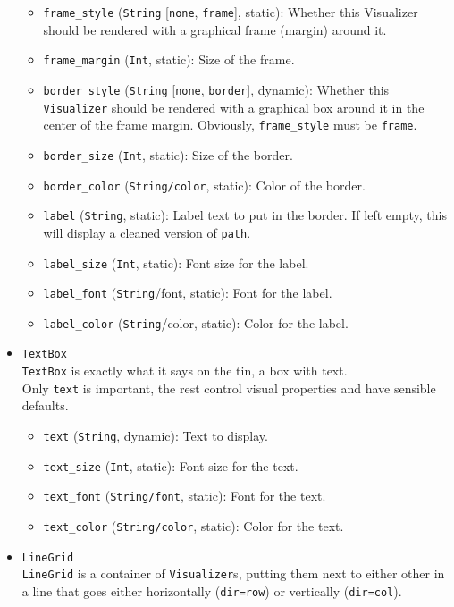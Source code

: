 \documentclass[11pt]{article}
\begin{document}
\begin{itemize}
\begin{itemize}
    \item \texttt{frame\_style} (\texttt{String} [\texttt{none}, \texttt{frame}], static): Whether this Visualizer should be rendered with a graphical frame (margin) around it.
    \item \texttt{frame\_margin} (\texttt{Int}, static): Size of the frame.
    \item \texttt{border\_style} (\texttt{String} [\texttt{none}, \texttt{border}], dynamic): Whether this \texttt{Visualizer} should be rendered with a graphical box around it in the center of the frame margin. Obviously, \texttt{frame\_style} must be \texttt{frame}.
    \item \texttt{border\_size} (\texttt{Int}, static): Size of the border.
    \item \texttt{border\_color} (\texttt{String/color}, static): Color of the border.
    \item \texttt{label} (\texttt{String}, static): Label text to put in the border. If left empty, this will display a cleaned version of \texttt{path}.
    \item \texttt{label\_size} (\texttt{Int}, static): Font size for the label.
    \item \texttt{label\_font} (\texttt{String}/font, static): Font for the label.
    \item \texttt{label\_color} (\texttt{String}/color, static): Color for the label.
  \end{itemize}
  \item \texttt{TextBox} \\
  \texttt{TextBox} is exactly what it says on the tin, a box with text. \\
  Only \texttt{text} is important, the rest control visual properties and have sensible defaults.
  \begin{itemize}
    \item \texttt{text} (\texttt{String}, dynamic): Text to display.
    \item \texttt{text\_size} (\texttt{Int}, static): Font size for the text.
    \item \texttt{text\_font} (\texttt{String/font}, static): Font for the text.
    \item \texttt{text\_color} (\texttt{String/color}, static): Color for the text.
  \end{itemize}
  \item \texttt{LineGrid} \\
  \texttt{LineGrid} is a container of \texttt{Visualizer}s, putting them next to either other in a line that goes either horizontally (\texttt{dir=row}) or vertically (\texttt{dir=col}). \\

\end{itemize}
\end{document}
